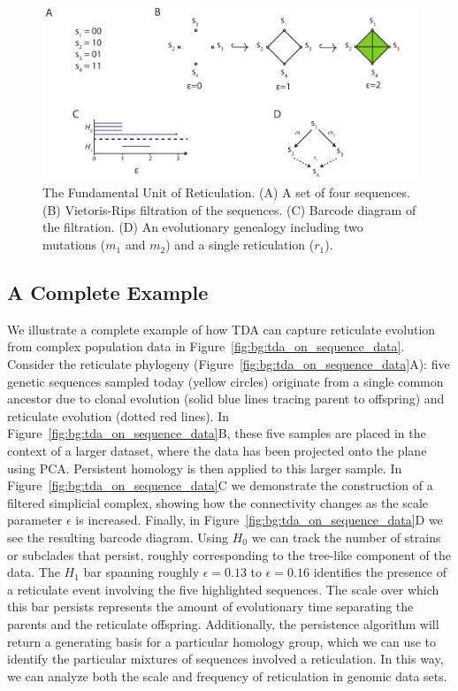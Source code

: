 \begin{figure}
	\centering
	\includegraphics[width=\textwidth]{./fig/background/four_gamete_test.pdf}
	\caption[Fundamental Unit of Reticulation]{The Fundamental Unit of Reticulation. (A) A set of four sequences. (B) Vietoris-Rips filtration of the sequences.  (C) Barcode diagram of the filtration. (D) An evolutionary genealogy including two mutations ($m_1$ and $m_2$) and a single reticulation ($r_1$).}
	\label{fig:bg:four_gamete_test}
\end{figure}

\subsection{A Complete Example}
\label{bg:top4bio:full_example}

We illustrate a complete example of how TDA can capture reticulate evolution from complex population data in Figure~\ref{fig:bg:tda_on_sequence_data}.
Consider the reticulate phylogeny (Figure~\ref{fig:bg:tda_on_sequence_data}A): five genetic sequences sampled today (yellow circles) originate from a single common ancestor due to clonal evolution (solid blue lines tracing parent to offspring) and reticulate evolution (dotted red lines).
In Figure~\ref{fig:bg:tda_on_sequence_data}B, these five samples are placed in the context of a larger dataset, where the data has been projected onto the plane using PCA.
Persistent homology is then applied to this larger sample.
In Figure~\ref{fig:bg:tda_on_sequence_data}C we demonstrate the construction of a filtered simplicial complex, showing how the connectivity changes as the scale parameter $\epsilon$ is increased.
Finally, in Figure~\ref{fig:bg:tda_on_sequence_data}D we see the resulting barcode diagram.
Using $H_0$ we can track the number of strains or subclades that persist, roughly corresponding to the tree-like component of the data.
The $H_1$ bar spanning roughly $\epsilon=0.13$ to $\epsilon=0.16$ identifies the presence of a reticulate event involving the five highlighted sequences.
The scale over which this bar persists represents the amount of evolutionary time separating the parents and the reticulate offspring.
Additionally, the persistence algorithm will return a generating basis for a particular homology group, which we can use to identify the particular mixtures of sequences involved a reticulation.
In this way, we can analyze both the scale and frequency of reticulation in genomic data sets.

